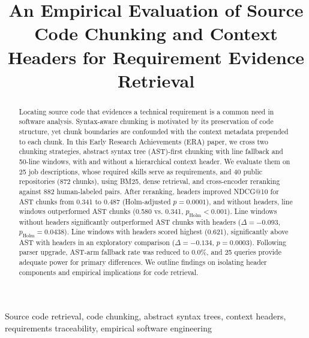 \documentclass[10pt,conference]{IEEEtran}
\begin{document}
\title{An Empirical Evaluation of Source Code Chunking and Context Headers for Requirement Evidence Retrieval}

\author{}

\maketitle

\begin{abstract}
Locating source code that evidences a technical requirement is a common need in software analysis. 
Syntax-aware chunking is motivated by its preservation of code structure, yet chunk boundaries are confounded with the context metadata prepended to each chunk. 
In this Early Research Achievements (ERA) paper, we cross two chunking strategies, abstract syntax tree (AST)-first chunking with line fallback and 50-line windows, with and without a hierarchical context header. 
We evaluate them on 25 job descriptions, whose required skills serve as requirements, and 40 public repositories (872 chunks), using BM25, dense retrieval, and cross-encoder reranking against 882 human-labeled pairs. 
After reranking, headers improved NDCG@10 for AST chunks from 0.341 to 0.487 (Holm-adjusted $p = 0.0001$), and without headers, line windows outperformed AST chunks (0.580 vs. 0.341, $p_{\mathrm{Holm}} < 0.001$). 
Line windows without headers significantly outperformed AST chunks with headers ($\Delta = -0.093$, $p_{\mathrm{Holm}} = 0.0438$). 
Line windows with headers scored highest (0.621), significantly above AST with headers in an exploratory comparison ($\Delta = -0.134$, $p = 0.0003$). 
Following parser upgrade, AST-arm fallback rate was reduced to 0.0\%, and 25 queries provide adequate power for primary differences. 
We outline findings on isolating header components and empirical implications for code retrieval.
\end{abstract}

\begin{IEEEkeywords}
Source code retrieval, code chunking, abstract syntax trees, context headers, requirements traceability, empirical software engineering
\end{IEEEkeywords}









\clearpage


\end{document}
